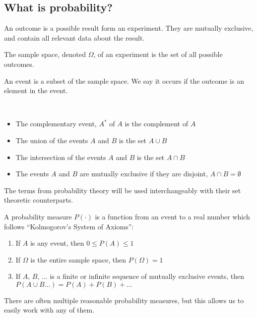 \subsection{What is probability?}

\begin{definition}[Outcome]
	An outcome is a possible result form an experiment. They are mutually exclusive, and contain all relevant data about the result.
\end{definition}

\begin{definition}
	The sample space, denoted \(\Omega\), of an experiment is the set of all possible outcomes.
\end{definition}

\begin{definition}[Event]
	An event is a subset of the sample space. We say it occurs if the outcome is an element in the event.
\end{definition}

\begin{definition}~
	\begin{itemize}
		\item The complementary event, \(A^*\) of \(A\) is the complement of \(A\)
		\item The union of the events \(A\) and \(B\) is the set \(A \cup B\) 
		\item The intersection of the events \(A\) and \(B\) is the set \(A \cap B\) 
		\item The events \(A\) and \(B\) are mutually exclusive if they are disjoint, \(A \cap B = \emptyset\) 
	\end{itemize}
\end{definition}

\begin{obs}
	The terms from probability theory will be used interchangeably with their set theoretic counterparts.
\end{obs}

\begin{definition}
	A probability measure \(P( \cdot )\) is a function from an event to a real number which follows ``Kolmogorov's System of Axioms'':
	\begin{enumerate}[leftmargin = 3em, wide=1em, label={Axiom \arabic*:}]
		\item If \(A\) is any event, then \(0 \leq P(A) \leq 1\) 
		\item If \(\Omega \) is the entire sample space, then \(P(\Omega ) = 1\) 
		\item If \(A\), \(B\), \(\dots \)  is a finite or infinite sequence of mutually exclusive events, then \(P(A \cup B \dots) = P(A) + P(B) + \dots  \)
	\end{enumerate}
	There are often multiple reasonable probability measures, but this allows us to easily work with any of them.
\end{definition}

